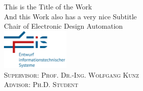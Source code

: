 \documentclass[a4paper, 11pt, twoside]{article}
\begin{document}

\begin{titlepage} %

	\centering %
	\vspace*{\baselineskip}
	\vspace{8\baselineskip} %
	
	\LARGE\textcolor{rptudunkelblau}{This is the Title of the Work} \\
	\vspace*{\baselineskip}
	\textcolor{rptudunkelblau}{And this Work also has a very nice Subtitle}\\
	\vspace*{\baselineskip}
	\vspace{8\baselineskip}
	\textcolor{rptudunkelblau}{Chair of Electronic Design Automation}\\
	\vspace{1\baselineskip}
	\includegraphics[width=0.25\textwidth]{images/EIS-Logo.png}\\
    \vspace{1\baselineskip}
	\scshape\Large \textcolor{rptudunkelblau}{Supervisor: Prof. Dr.-Ing. Wolfgang Kunz\\Advisor: Ph.D. Student}\\
	
\end{titlepage}

\newpage
\thispagestyle{empty}
\section*{}
\newpage
\end{document}
